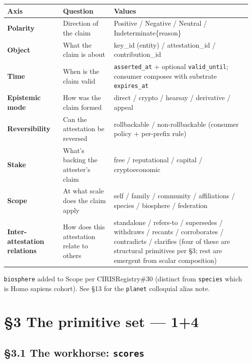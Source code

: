 \documentclass[10pt]{article}
\begin{document}
{\footnotesize
\begin{longtable}{|p{5.33cm}|p{5.33cm}|p{5.33cm}|}\hline
\textbf{Axis} & \textbf{Question} & \textbf{Values} \\ \hline\endhead
\textbf{Polarity} & Direction of the claim & Positive / Negative / Neutral / Indeterminate\{reason\} \\ \hline
\textbf{Object} & What the claim is about & key\_id (entity) / attestation\_id / contribution\_id \\ \hline
\textbf{Time} & When is the claim valid & \texttt{asserted\_at} + optional \texttt{valid\_until}; consumer composes with substrate \texttt{expires\_at} \\ \hline
\textbf{Epistemic mode} & How was the claim formed & direct / crypto / hearsay / derivative / appeal \\ \hline
\textbf{Reversibility} & Can the attestation be reversed & rollbackable / non-rollbackable (consumer policy + per-prefix rule) \\ \hline
\textbf{Stake} & What's backing the attester's claim & free / reputational / capital / cryptoeconomic \\ \hline
\textbf{Scope} & At what scale does the claim apply & self / family / community / affiliations / species / biosphere / federation \\ \hline
\textbf{Inter-attestation relations} & How does this attestation relate to others & standalone / refers-to / supersedes / withdraws / recants / corroborates / contradicts / clarifies (four of these are structural primitives per §3; rest are emergent from scalar composition) \\ \hline
\end{longtable}}


\texttt{biosphere} added to Scope per CIRISRegistry\#30 (distinct from \texttt{species} which is Homo sapiens cohort). See §13 for the \texttt{planet} colloquial alias note.




\clearpage


\section*{§3 The primitive set — 1+4}


\subsection*{§3.1 The workhorse: \texttt{scores}}
\end{document}
